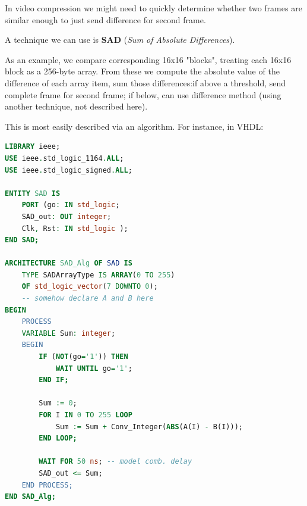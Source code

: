 \documentclass[a4paper,11pt]{article}
\begin{document}
In video compression we might need to quickly determine whether two frames are similar enough to just send difference for second frame.

A technique we can use is \textbf{SAD} (\textit{Sum of Absolute Differences}).

As an example, we compare corresponding 16x16 "blocks", treating each 16x16 block as a 256-byte array.
From these we compute the absolute value of the difference of each array item, sum those differences:if above a threshold, send complete frame for second frame; if below, can use difference method (using another technique, not described here).

This is most easily described via an algorithm.
For instance, in VHDL:

\begin{lstlisting}[language=vhdl, style=codestyle]	
LIBRARY ieee;
USE ieee.std_logic_1164.ALL;
USE ieee.std_logic_signed.ALL;

ENTITY SAD IS
	PORT (go: IN std_logic;
	SAD_out: OUT integer;
	Clk, Rst: IN std_logic );
END SAD;

ARCHITECTURE SAD_Alg OF SAD IS
	TYPE SADArrayType IS ARRAY(0 TO 255)
	OF std_logic_vector(7 DOWNTO 0);
	-- somehow declare A and B here
BEGIN
	PROCESS
	VARIABLE Sum: integer;
	BEGIN
		IF (NOT(go='1')) THEN
			WAIT UNTIL go='1';
		END IF;

		Sum := 0;
		FOR I IN 0 TO 255 LOOP
			Sum := Sum + Conv_Integer(ABS(A(I) - B(I)));
		END LOOP;

		WAIT FOR 50 ns; -- model comb. delay
		SAD_out <= Sum;
	END PROCESS;
END SAD_Alg;
\end{lstlisting}
\end{document}
